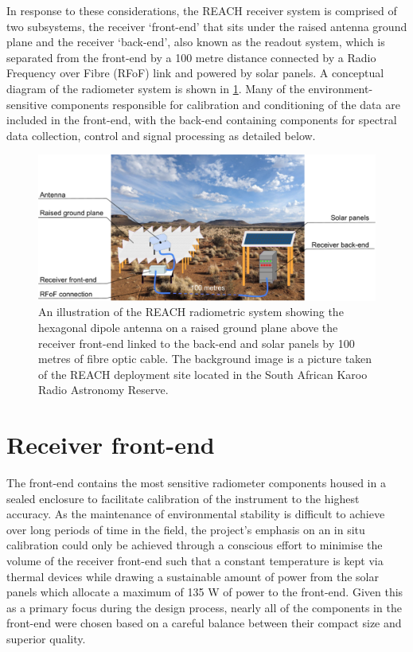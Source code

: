 In response to these considerations, the REACH receiver system is comprised of two subsystems, the receiver ‘front-end’ that sits under the raised antenna ground plane and the receiver ‘back-end’, also known as the readout system, which is separated from the front-end by a 100 metre distance connected by a Radio Frequency over Fibre (RFoF) link and powered by solar panels. A conceptual diagram of the radiometer system is shown in \cref{fig:system_diagram}. Many of the environment-sensitive components responsible for calibration and conditioning of the data are included in the front-end, with the back-end containing components for spectral data collection, control and signal processing as detailed below.
\begin{figure}
    \centering
    \includegraphics[width=\textwidth]{system_diagram}
    \caption{An illustration of the REACH radiometric system showing the hexagonal dipole antenna on a raised ground plane above the receiver front-end linked to the back-end and solar panels by 100 metres of fibre optic cable. The background image is a picture taken of the REACH deployment site located in the South African Karoo Radio Astronomy Reserve.}
    \label{fig:system_diagram}
\end{figure}


\section{Receiver front-end}\label{sec:frontend}
The front-end contains the most sensitive radiometer components housed in a sealed enclosure to facilitate calibration of the instrument to the highest accuracy. As the maintenance of environmental stability is difficult to achieve over long periods of time in the field, the project’s emphasis on an in situ calibration could only be achieved through a conscious effort to minimise the volume of the receiver front-end such that a constant temperature is kept via thermal devices while drawing a sustainable amount of power from the solar panels which allocate a maximum of 135 W of power to the front-end. Given this as a primary focus during the design process, nearly all of the components in the front-end were chosen based on a careful balance between their compact size and superior quality.


